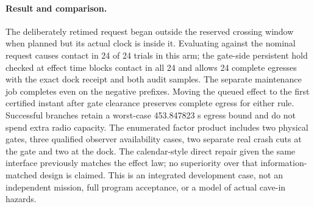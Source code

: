 \documentclass{article}
\begin{document}
\paragraph{Result and comparison.}
The deliberately retimed request began outside the reserved crossing
window when planned but its actual clock is inside it. Evaluating
against the nominal request causes contact in 24 of 24 trials in this
arm; the gate-side persistent hold checked at effect time blocks
contact in all 24 and allows 24 complete egresses with the exact
dock receipt and both audit samples. The separate maintenance job
completes even on the negative prefixes. Moving the queued effect to
the first certified instant after gate clearance preserves complete
egress for either rule. Successful branches retain a worst-case
453.847823 s egress bound and do not spend extra radio capacity.
The enumerated factor product includes two physical gates, three
qualified observer availability cases, two separate real crash cuts
at the gate and two at the dock. The calendar-style direct repair
given the same interface previously matches the effect law; no
superiority over that information-matched design is claimed.
This is an integrated development case, not an independent mission,
full program acceptance, or a model of actual cave-in hazards.
\end{document}
